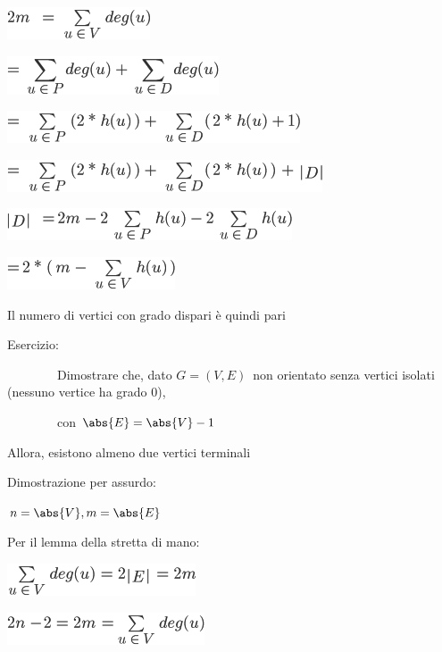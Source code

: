 \documentclass{article}
\begin{document}
{\includegraphics{images/image369.png}

\includegraphics{images/image370.png}{~}

\includegraphics{images/image371.png}{~}

\includegraphics{images/image372.png}{~}

{}

\includegraphics{images/image373.png}

\includegraphics{images/image374.png}{~}

{Il numero di vertici con grado dispari è quindi pari}

{}

{Esercizio}{: }

{~~~~~~~~Dimostrare che, dato
}$G=(V,E)${~non orientato senza vertici
isolati (nessuno vertice ha grado 0),}

{~~~~~~~~con $\abs{E} = \abs{V} -1$}

{Allora, esistono almeno due vertici terminali}

{}

{Dimostrazione per assurdo:}

$n=\abs{V},m=\abs{E}$

{Per il lemma della stretta di mano:}

\includegraphics{images/image377.png}

\includegraphics{images/image378.png}

}
\end{document}
